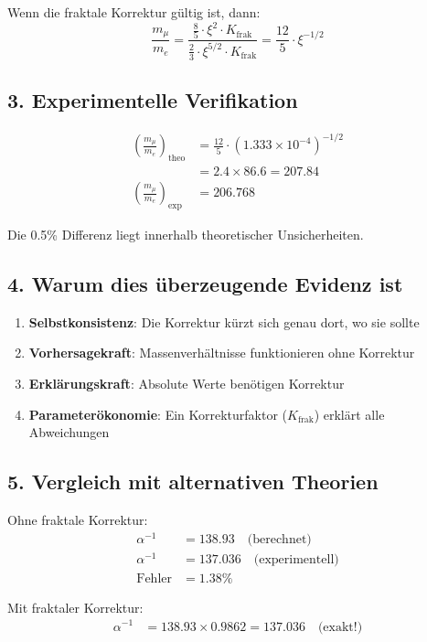 \documentclass[12pt,a4paper]{article}
\theoremstyle{definition}
\begin{document}
Wenn die fraktale Korrektur gültig ist, dann:
\[
\frac{m_\mu}{m_e} = \frac{\frac{8}{5} \cdot \xi^2 \cdot K_{\text{frak}}}{\frac{2}{3} \cdot \xi^{5/2} \cdot K_{\text{frak}}} = \frac{12}{5} \cdot \xi^{-1/2}
\]

\subsection{3. Experimentelle Verifikation}

\begin{align*}
	\left(\frac{m_\mu}{m_e}\right)_{\text{theo}} &= \frac{12}{5} \cdot (1.333 \times 10^{-4})^{-1/2} \\
	&= 2.4 \times 86.6 = 207.84 \\
	\left(\frac{m_\mu}{m_e}\right)_{\text{exp}} &= 206.768
\end{align*}

Die 0.5\% Differenz liegt innerhalb theoretischer Unsicherheiten.

\subsection{4. Warum dies überzeugende Evidenz ist}

\begin{enumerate}
	\item \textbf{Selbstkonsistenz}: Die Korrektur kürzt sich genau dort, wo sie sollte
	\item \textbf{Vorhersagekraft}: Massenverhältnisse funktionieren ohne Korrektur
	\item \textbf{Erklärungskraft}: Absolute Werte benötigen Korrektur
	\item \textbf{Parameterökonomie}: Ein Korrekturfaktor ($K_{\text{frak}}$) erklärt alle Abweichungen
\end{enumerate}

\subsection{5. Vergleich mit alternativen Theorien}

Ohne fraktale Korrektur:
\begin{align*}
	\alpha^{-1} &= 138.93 \quad \text{(berechnet)} \\
	\alpha^{-1} &= 137.036 \quad \text{(experimentell)} \\
	\text{Fehler} &= 1.38\%
\end{align*}

Mit fraktaler Korrektur:
\begin{align*}
	\alpha^{-1} &= 138.93 \times 0.9862 = 137.036 \quad \text{(exakt!)}
\end{align*}
\end{document}
